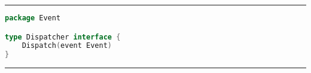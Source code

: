 
\phantom{blank}
\vspace{5mm}
\hrule
\begin{lstlisting}[language=Go,caption={Dispatcher.go},breaklines=true,label={lst:Dispatcher}]
package Event

type Dispatcher interface {
	Dispatch(event Event)
}


\end{lstlisting}
\hrule